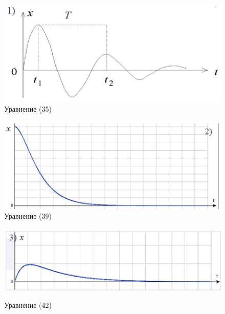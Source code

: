 \begin{figure}[h!]
        \begin{minipage}[h]{0.32\linewidth}
	\includegraphics[width = 0.8\linewidth]{pwf1}\\
	\caption{Уравнение (35)}
	\end{minipage}
	\begin{minipage}[h]{0.32\linewidth}
	\includegraphics[width = 0.8\linewidth]{pwf2}\\
	\caption{Уравнение (39)}
	\end{minipage}
	\begin{minipage}[h]{0.32\linewidth}
	\includegraphics[width = 0.85\linewidth]{pwf3}\\
	\caption{Уравнение (42)}
	\end{minipage}
\end{figure} 
